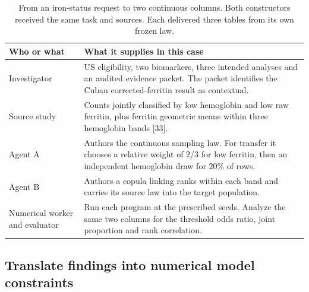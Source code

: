 \documentclass[sigconf,review]{acmart}
\begin{document}
\begin{table}[tp]

\caption{From an iron-status request to two continuous columns. Both constructors received the same task and sources. Each delivered three tables from its own frozen law.}

\label{tab:1}

\centering\small

\renewcommand{\arraystretch}{1.12}

\begin{tabularx}{\textwidth}{@{}>{\raggedright\arraybackslash}p{}>{\raggedright\arraybackslash}X@{}}

\toprule

Who or what & What it supplies in this case \\

\midrule

Investigator & US eligibility, two biomarkers, three intended analyses and an audited evidence packet. The packet identifies the Cuban corrected-ferritin result as contextual. \\

Source study & Counts jointly classified by low hemoglobin and low raw ferritin, plus ferritin geometric means within three hemoglobin bands [33]. \\

Agent A & Authors the continuous sampling law. For transfer it chooses a relative weight of 2/\allowbreak{}3 for low ferritin, then an independent hemoglobin draw for 20\% of rows. \\

Agent B & Authors a copula linking ranks within each band and carries its source law into the target population. \\

Numerical worker and evaluator & Run each program at the prescribed seeds. Analyze the same two columns for the threshold odds ratio, joint proportion and rank correlation. \\

\bottomrule

\end{tabularx}

\end{table}

\subsection{Translate findings into numerical model constraints}
\end{document}
